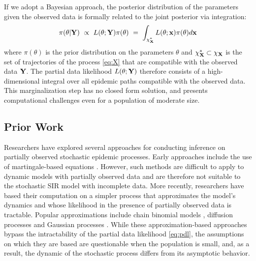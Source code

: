 \documentclass[11pt]{article}
\begin{document}
	If we adopt a Bayesian approach, the posterior distribution of the parameters given the observed data is formally related to the joint posterior via integration:
	\begin{equation}
		\label{eq:pdl}
		\pi(\theta|\mathbf{Y}) 
		\, \, \propto \, \, L(\theta; \mathbf{Y})\pi(\theta) \, \, = \, \, \int_{\chi^*_{\mathbf{X}}} L(\theta; \mathbf{x}) \pi(\theta) d\mathbf{x}
	\end{equation}
	where $\pi(\theta)$ is the prior distribution on the parameters $\theta$ and
	$\chi^*_{\mathbf{X}} \subset \chi_{\mathbf{X}}$ is the set of trajectories of the process \eqref{eq:X} that are compatible with the observed data $\mathbf{Y}$.
	The partial data likelihood $L(\theta; \mathbf{Y})$ therefore consists of a high-dimensional integral over all epidemic paths compatible with the observed data. This marginalization step has no closed form solution, and presents computational challenges even for a population of moderate size.
	
	\subsection{Prior Work}
	\label{sec:pre}
	Researchers have explored several approaches for conducting inference on partially observed stochastic epidemic processes. Early approaches include the use of martingale-based equations \cite{Becker.1977, Watson.1981, Sudbury.1985}. However, such methods are difficult to apply to dynamic models with partially observed data and are therefore not suitable to the stochastic SIR model with incomplete data.
	More recently, researchers have based their computation on a simpler process that approximates the model's dynamics and whose likelihood in the presence of partially observed data is tractable. Popular approximations include chain binomial models \cite{Greenwood.1931, Abbey.1952}, diffusion processes \cite{Cauchemez.2008, Fintzi.2020} and Gaussian processes \cite{Jandarov.2014}. While these approximation-based approaches bypass the intractability of the partial data likelihood \ref{eq:pdl}, the assumptions on which they are based are questionable when the population is small, and, as a result, the dynamic of the stochastic process differs from its asymptotic behavior.
	
\end{document}
